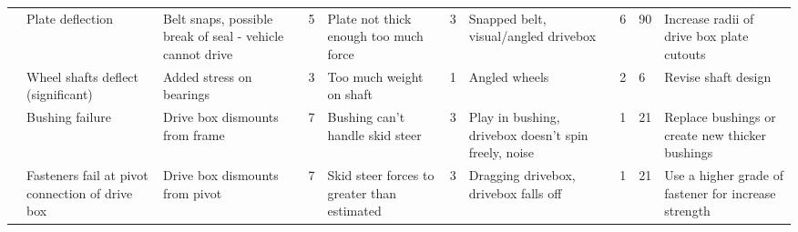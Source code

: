 \begin{landscape}
\begin{table}
\begin{tabular}{| p{1.5cm}|p{3cm}p{3cm}p{0.5cm}p{3cm}p{0.5cm}p{3.5cm}p{0.5cm}p{0.5cm}p{3cm} |}
 & Plate deflection & Belt snaps, possible break of seal - vehicle cannot drive & 5 & Plate not thick enough too much force & 3 & Snapped belt, visual/angled drivebox & 6 & 90 & Increase radii of drive box plate cutouts \\
 & Wheel shafts deflect (significant) & Added stress on bearings & 3 & Too much weight on shaft & 1 & Angled wheels & 2 & 6 & Revise shaft design \\
 & Bushing failure & Drive box dismounts from frame & 7 & Bushing can't handle skid steer & 3 & Play in bushing, drivebox doesn't spin freely, noise & 1 & 21 & Replace bushings or create new thicker bushings \\
 & Fasteners fail at pivot connection of drive box & Drive box dismounts from pivot & 7 & Skid steer forces to greater than estimated & 3 & Dragging drivebox, drivebox falls off & 1 & 21 & Use a higher grade of fastener for increase strength \\ \hline
 \end{tabular}
 \label{tab:dfmea}
 \end{table}
 \end{landscape}
